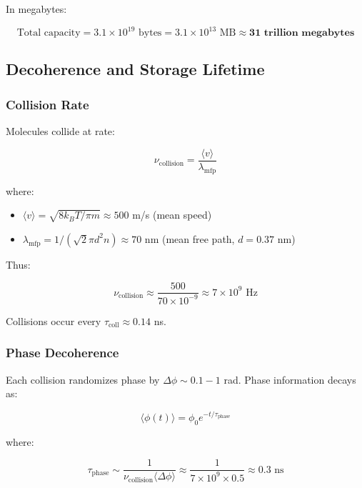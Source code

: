 In megabytes:

\begin{equation}
\text{Total capacity} = 3.1 \times 10^{19} \text{ bytes} = 3.1 \times 10^{13} \text{ MB} \approx \mathbf{31 \text{ trillion megabytes}}
\end{equation}

\subsection{Decoherence and Storage Lifetime}

\subsubsection{Collision Rate}

Molecules collide at rate:

\begin{equation}
\nu_{\text{collision}} = \frac{\langle v \rangle}{\lambda_{\text{mfp}}}
\end{equation}

where:
\begin{itemize}
\item $\langle v \rangle = \sqrt{8k_B T/\pi m} \approx 500$ m/s (mean speed)
\item $\lambda_{\text{mfp}} = 1/(\sqrt{2}\pi d^2 n) \approx 70$ nm (mean free path, $d = 0.37$ nm)
\end{itemize}

Thus:

\begin{equation}
\nu_{\text{collision}} \approx \frac{500}{70 \times 10^{-9}} \approx 7 \times 10^9 \text{ Hz}
\end{equation}

Collisions occur every $\tau_{\text{coll}} \approx 0.14$ ns.

\subsubsection{Phase Decoherence}

Each collision randomizes phase by $\Delta\phi \sim 0.1-1$ rad. Phase information decays as:

\begin{equation}
\langle\phi(t)\rangle = \phi_0 e^{-t/\tau_{\text{phase}}}
\end{equation}

where:

\begin{equation}
\tau_{\text{phase}} \sim \frac{1}{\nu_{\text{collision}}\langle\Delta\phi\rangle} \approx \frac{1}{7 \times 10^9 \times 0.5} \approx 0.3 \text{ ns}
\end{equation}

